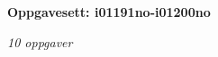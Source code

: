 \centerline{\bf Oppgavesett: i01191no-i01200no}
\vskip 10pt
\centerline{\it 10 oppgaver}\vskip 10pt
\vskip 10pt
